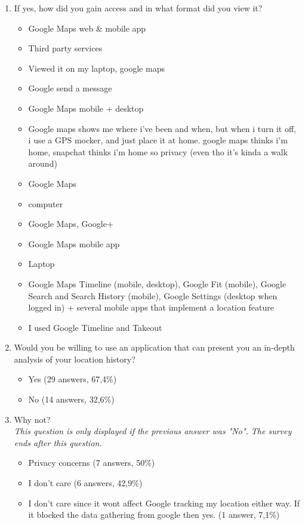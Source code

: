 \documentclass[12p]{article}
\begin{document}
\begin{enumerate}
    \item If yes, how did you gain access and in what format did you view it?
    \begin{itemize}
        \item Google Maps web \& mobile app
        \item Third party services
        \item Viewed it on my laptop, google maps
        \item Google send a message
        \item Google Maps mobile + desktop 
        \item Google maps shows me where i've been and when, but when i turn it off, i use a GPS mocker, and just place it at home. google maps thinks i'm home, snapchat thinks i'm home so privacy (even tho it's kinda a walk around)
        \item Google Maps
        \item computer
        \item Google Maps, Google+
        \item Google Maps mobile app
        \item Laptop
        \item Google Maps Timeline (mobile, desktop), Google Fit (mobile), Google Search and Search History (mobile), Google Settings (desktop when logged in) + several mobile apps that implement a location feature
        \item I used Google Timeline and Takeout
    \end{itemize}
    
    \item Would you be willing to use an application that can present you an in-depth analysis of your location history?
    \begin{itemize}
        \item Yes (29 answers, 67,4\%)
        \item No (14 answers, 32,6\%)
    \end{itemize}
    
    \item Why not?
    \\\textit{This question is only displayed if the previous answer was "No". The survey ends after this question.}
    \begin{itemize}
        \item Privacy concerns (7 answers, 50\%)
        \item I don't care (6 answers, 42,9\%)
        \item I don't care since it wont affect Google tracking my location either way. If it blocked the data gathering from google then yes. (1 answer, 7,1\%)
    \end{itemize}
    

\end{enumerate}
\end{document}
